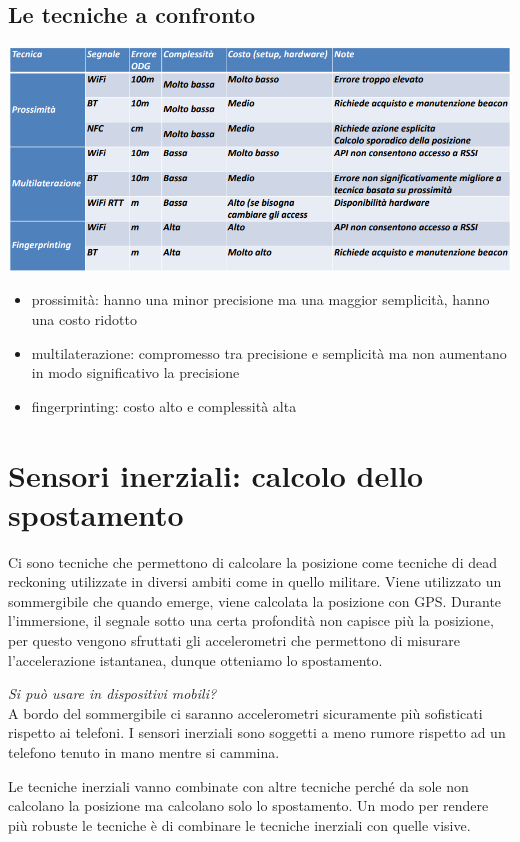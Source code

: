 \subsection{Le tecniche a confronto}

\includegraphics[width = \textwidth]{images/MobiDEV/1. posizionamento indoor/3 tecniche radio.PNG}

\begin{itemize}
    \item prossimità: hanno una minor precisione ma una maggior semplicità, hanno una costo ridotto
    \item multilaterazione: compromesso tra precisione e semplicità ma non aumentano in modo significativo la precisione
    \item fingerprinting: costo alto e complessità alta
\end{itemize}

\section{Sensori inerziali: calcolo dello spostamento}
Ci sono tecniche che permettono di calcolare la posizione come tecniche di dead reckoning utilizzate in diversi ambiti come in quello militare. Viene utilizzato un sommergibile che quando emerge, viene calcolata la posizione con GPS. Durante l'immersione, il segnale sotto una certa profondità non capisce più la posizione, per questo vengono sfruttati gli accelerometri che permettono di misurare l'accelerazione istantanea, dunque otteniamo lo spostamento. 

\textit{Si può usare in dispositivi mobili?}
\\ A bordo del sommergibile ci saranno accelerometri sicuramente più sofisticati rispetto ai telefoni. I sensori inerziali sono soggetti a meno rumore rispetto ad un telefono tenuto in mano mentre si cammina. 

Le tecniche inerziali vanno combinate con altre tecniche perché da sole non calcolano la posizione ma calcolano solo lo spostamento.
Un modo per rendere più robuste le tecniche è di combinare le tecniche inerziali con quelle visive. 

